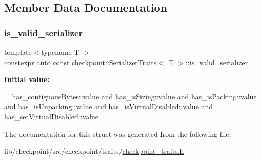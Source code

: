 \subsection{Member Data Documentation}
\mbox{\label{structcheckpoint_1_1_serializer_traits_a8818dc68069bcf67d4d2b43a9cd57026}} 
\subsubsection{\texorpdfstring{is\+\_\+valid\+\_\+serializer}{is\_valid\_serializer}}
{\footnotesize\ttfamily template$<$typename T $>$ \\
constexpr auto const \hyperlink{structcheckpoint_1_1_serializer_traits}{checkpoint\+::\+Serializer\+Traits}$<$ T $>$\+::is\+\_\+valid\+\_\+serializer\hspace{0.3cm}{\ttfamily [static]}}

{\bfseries Initial value\+:}
\begin{DoxyCode}
=
    has\_contiguousBytes::value and
    has\_isSizing::value and
    has\_isPacking::value and
    has\_isUnpacking::value and
    has\_isVirtualDisabled::value and
    has\_setVirtualDisabled::value
\end{DoxyCode}


The documentation for this struct was generated from the following file\+:\begin{DoxyCompactItemize}
\item 
lib/checkpoint/src/checkpoint/traits/\hyperlink{checkpoint__traits_8h}{checkpoint\+\_\+traits.\+h}\end{DoxyCompactItemize}
